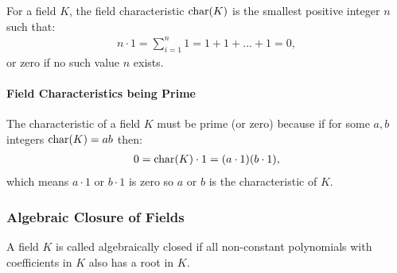For a field $K$, the field characteristic $\operatorname{char}(K)$ is the 
smallest positive integer $n$ such that: \begin{gather*}
  n \cdot 1 = \sum_{i = 1}^{n} 1 = 1 + 1 + \ldots + 1 = 0,
\end{gather*} or zero if no such value $n$ exists.

\paragraph{Field Characteristics being Prime}
The characteristic of a field $K$ must be prime (or zero) 
because if for some $a, b$ integers $\operatorname{char}(K) = ab$ then: \begin{gather*}
  0 = \operatorname{char}(K) \cdot 1 = (a \cdot 1)(b \cdot 1),
\end{gather*} which means $a \cdot 1$ or $b \cdot 1$ is zero so $a$ or $b$
is the characteristic of $K$.

\subsubsection{Algebraic Closure of Fields}

A field $K$ is called algebraically closed if all non-constant polynomials 
with coefficients in $K$ also has a root in $K$.